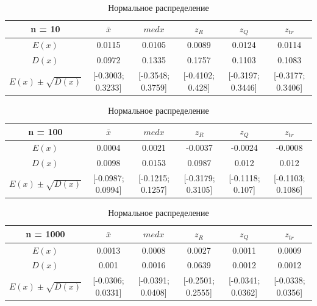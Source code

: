 \documentclass[12pt]{article}
\begin{document}
\begin{center}
  \begin{table}[!hbt]
\caption{Нормальное распределение}
\begin{adjustbox}{width=\textwidth}
\begin{tabular}{| c | c | c | c | c | c |}
\hline
n = 10 & $\bar{x}$ & $med x$ & $z_R$ & $z_Q$ & $z_{tr}$ \\\hline
$E(x)$ & 0.0115 & 0.0105 & 0.0089 & 0.0124 & 0.0114 \\\hline
$D(x)$ & 0.0972 & 0.1335 & 0.1757 & 0.1103 & 0.1083 \\\hline
$E(x) \pm \sqrt{D(x)}$ & [-0.3003; 0.3233] & [-0.3548; 0.3759] & [-0.4102; 0.428] & [-0.3197; 0.3446] & [-0.3177; 0.3406]\\\hline
\end{tabular}
\end{adjustbox}

\begin{adjustbox}{width=\textwidth}
\begin{tabular}{| c | c | c | c | c | c |}
\hline
n = 100 & $\bar{x}$ & $med x$ & $z_R$ & $z_Q$ & $z_{tr}$ \\\hline
$E(x)$ & 0.0004 & 0.0021 & -0.0037 & -0.0024 & -0.0008 \\\hline
$D(x)$ & 0.0098 & 0.0153 & 0.0987 & 0.012 & 0.012 \\\hline
$E(x) \pm \sqrt{D(x)}$ & [-0.0987; 0.0994] & [-0.1215; 0.1257] & [-0.3179; 0.3105] & [-0.1118; 0.107] & [-0.1103; 0.1086]\\\hline
\end{tabular}
\end{adjustbox}

\begin{adjustbox}{width=\textwidth}
\begin{tabular}{| c | c | c | c | c | c |}
\hline
n = 1000 & $\bar{x}$ & $med x$ & $z_R$ & $z_Q$ & $z_{tr}$ \\\hline
$E(x)$ & 0.0013 & 0.0008 & 0.0027 & 0.0011 & 0.0009 \\\hline
$D(x)$ & 0.001 & 0.0016 & 0.0639 & 0.0012 & 0.0012 \\\hline
$E(x) \pm \sqrt{D(x)}$ & [-0.0306; 0.0331] & [-0.0391; 0.0408] & [-0.2501; 0.2555] & [-0.0341; 0.0362] & [-0.0338; 0.0356]\\\hline
\end{tabular}
\end{adjustbox}


\end{table}
\end{center}
\end{document}
